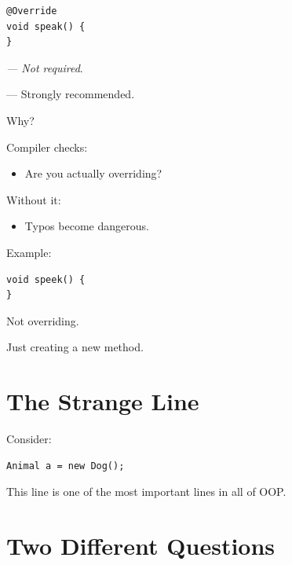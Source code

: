 \documentclass[11pt,a4paper]{book}
\begin{document}
\begin{verbatim}
@Override
void speak() {
}
\end{verbatim}


\emph{--- Not required}.

\textcolor{RosettaOrange}{--- Strongly recommended}.


Why?
\newline

Compiler checks:
\begin{itemize}
\item Are you actually \textcolor{RosettaDeepGreen}{overriding}?
\end{itemize}

Without it:
\begin{itemize}
\item \textcolor{RosettaRed}{Typos} become dangerous.
\end{itemize}

Example:

\begin{verbatim}
void speek() {
}
\end{verbatim}


Not overriding.

Just creating a new method.


\section{The Strange Line}

Consider:

\begin{verbatim}
Animal a = new Dog();
\end{verbatim}


This line is one of the most important
lines in all of OOP.\@


\section{Two Different Questions}
\end{document}
